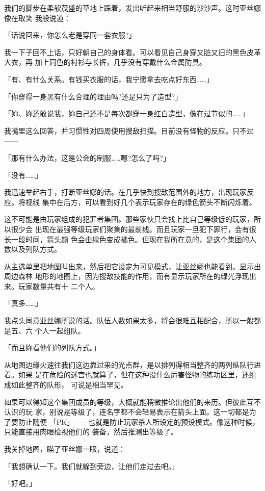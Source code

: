\documentclass[11pt]{book}
\begin{document}
我们的脚步在柔软茂盛的草地上踩着，发出听起来相当舒服的沙沙声。这时亚丝娜像在取笑
我般说道：

「话说回来，你怎么老是穿同一套衣服?」

我一下子回不上话，只好朝自己的身体看。可以看见自己身穿又脏又旧的黑色皮革大衣，再
加上同色的衬衫与长裤，几乎没有穿戴什么金属防具。

「有、有什么关系。有钱买衣服的话，我宁愿拿去吃点好东西……」

「你穿得一身黑有什么合理的理由吗?还是只为了造型?」

「妳、妳还敢说我，妳自己还不是每次都穿一身红白造型，像在过节似的……」

我嘴里这么回答，并习惯性对四周使用搜敌扫描。目前没有怪物的反应。只不过——

「那有什么办法，这是公会的制服……嗯?怎么了吗?」

「没有……」

我迅速举起右手，打断亚丝娜的话。在几乎快到搜敌范围外的地方，出现玩家反应。将视线
集中在后方，可以看到好几个表示玩家存在的绿色箭头不断闪烁着。

这不可能是由玩家组成的犯罪者集团。那些家伙只会找上比自己等级低的玩家，所以很少会
出现在最强等级玩家们聚集的最前线。而且玩家一旦犯下罪行，会有很长一段时间，箭头颜
色会由绿色变成橘色。但现在我所在意的，是这个集团的人数以及列队方式。

从主选单里把地图叫出来，然后把它设定为可见模式，让亚丝娜也能看到。显示出周边森林
地形的地图上，因为搜敌技能的作用，而有显示玩家所在的绿光浮现出来。玩家数量共有十
二个人。

「真多……」

我点头同意亚丝娜所说的话。队伍人数如果太多，将会很难互相配合，所以一般都是五、六
个人一起组队。

「而且妳看他们的列队方式。」

从地图边缘火速往我们这边靠过来的光点群，是以排列得相当整齐的两列纵队行进着。如果
是在危险的迷宫也就算了，但在这种没什么厉害怪物的练功区里，还组成如此整齐的队形，
可说是相当罕见。

如果可以得知这个集团成员的等级，大概就能稍微推论出他们的来历。但彼此互不认识的玩
家，别说是等级了，连名字都不会轻易表示在箭头上面。这一切都是为了要防止随便
「PK」——也就是防止玩家杀人所设定的预设模式。像这种时候，只能直接用肉眼检视他们的
装备，然后推测出等级了。

我关掉地图，瞄了亚丝娜一眼，说道：

「我想确认一下。我们就躲到旁边，让他们走过去吧。」

「好吧。」
\end{document}
